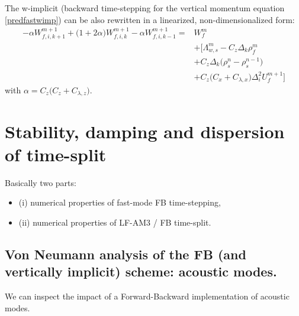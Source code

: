 \documentclass[a4paper,11pt]{article}
\begin{document}
\begin{itemize}[label=\textbullet,font=\tiny]
 The w-implicit (backward time-stepping for the vertical momentum equation \ref{predfastwimp}) 
 can be also rewritten in a linearized, non-dimensionalized form:
  \begin{equation}
  \label{predfastwimp}
  \begin{split}
    \displaystyle
     -\alpha W_{f,i,k+1}^{m+1}
     +\big(1+2\alpha\big)W_{f,i,k}^{m+1}
     -\alpha W_{f,i,k-1}^{m+1} =&
     W_{f}^m\\[3mm]
     & +\big[\Lambda_{w,s}^m
     -C_z \Delta_k\rho_{f}^m \\[3mm]
     &+C_z\Delta_k
     \big(\rho_{s}^{n}-\rho_{s}^{n-1}\big)\\[3mm]
     &+C_z\big( C_x + C_{\lambda,x} \big)
     \Delta_i^2 U_{f}^{m+1}
     \big]
  \end{split}
  \end{equation}
  with $\alpha=C_z\big(C_z+C_{\lambda,z}\big)$.
  
  \end{itemize}
  
\newpage
\section{Stability, damping and dispersion of time-split}

Basically two parts:

 \begin{itemize}[label=\textbullet,font=\tiny]
  \item (i) numerical properties of fast-mode FB time-stepping,
  \item (ii) numerical properties of LF-AM3 / FB time-split.
 \end{itemize}
 
\subsection{Von Neumann analysis of the FB (and vertically implicit) scheme: acoustic modes.}
\label{Subsec-VNAC}
We can inspect the impact of a Forward-Backward implementation of acoustic modes.
  
\end{document}
